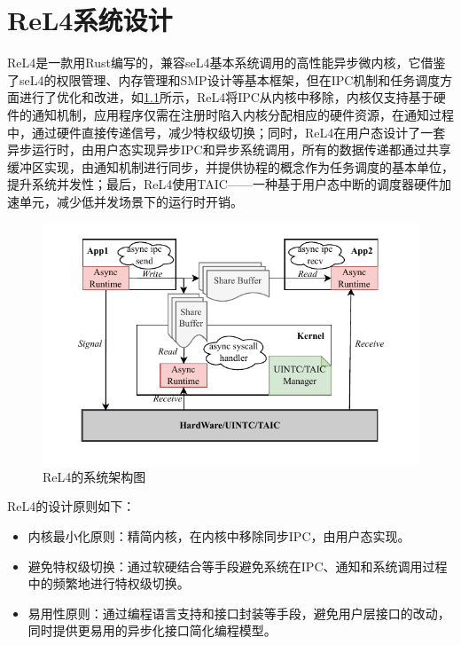 \chapter{ReL4系统设计}
\label{chap:ReL4_intro}
ReL4是一款用Rust编写的，兼容seL4基本系统调用的高性能异步微内核，它借鉴了seL4的权限管理、内存管理和SMP设计等基本框架，但在IPC机制和任务调度方面进行了优化和改进，如\ref{fig:ReL4_framework}所示，ReL4将IPC从内核中移除，内核仅支持基于硬件的通知机制，应用程序仅需在注册时陷入内核分配相应的硬件资源，在通知过程中，通过硬件直接传递信号，减少特权级切换；同时，ReL4在用户态设计了一套异步运行时，由用户态实现异步IPC和异步系统调用，所有的数据传递都通过共享缓冲区实现，由通知机制进行同步，并提供协程的概念作为任务调度的基本单位，提升系统并发性；最后，ReL4使用TAIC——一种基于用户态中断的调度器硬件加速单元，减少低并发场景下的运行时开销。

\begin{figure}[htbp]
  \centering
  \includegraphics{figures/ReL4_framework.drawio.pdf}
  \caption{ReL4的系统架构图}\label{fig:ReL4_framework}
\end{figure}

ReL4的设计原则如下：
\begin{itemize}
  \item 内核最小化原则：精简内核，在内核中移除同步IPC，由用户态实现。
  \item 避免特权级切换：通过软硬结合等手段避免系统在IPC、通知和系统调用过程中的频繁地进行特权级切换。
  \item 易用性原则：通过编程语言支持和接口封装等手段，避免用户层接口的改动，同时提供更易用的异步化接口简化编程模型。
\end{itemize}

